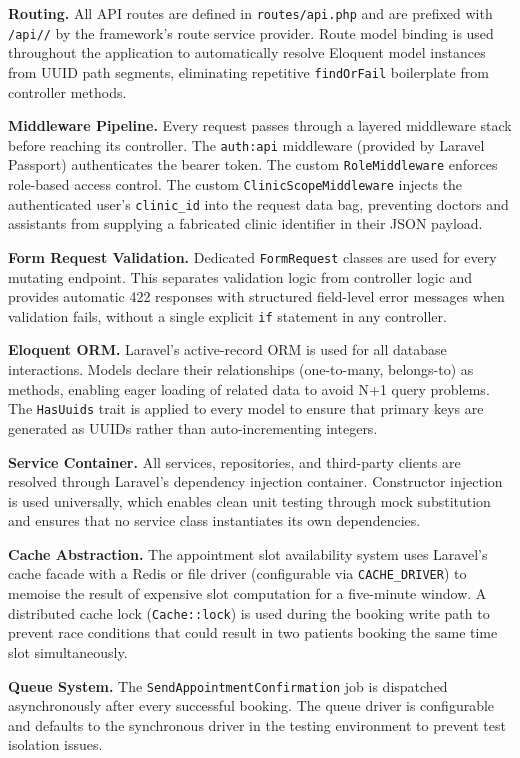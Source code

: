\textbf{Routing.} All API routes are defined in
\texttt{routes/api.php} and are prefixed with \texttt{/api/\apiversion{}/}
by the framework's route service provider. Route model binding is used
throughout the application to automatically resolve Eloquent model
instances from UUID path segments, eliminating repetitive
\texttt{findOrFail} boilerplate from controller methods.

\textbf{Middleware Pipeline.} Every request passes through a layered
middleware stack before reaching its controller. The \texttt{auth:api}
middleware (provided by Laravel Passport) authenticates the bearer token.
The custom \texttt{RoleMiddleware} enforces role-based access control.
The custom \texttt{ClinicScopeMiddleware} injects the authenticated
user's \texttt{clinic\_id} into the request data bag, preventing doctors
and assistants from supplying a fabricated clinic identifier in their
JSON payload.

\textbf{Form Request Validation.} Dedicated \texttt{FormRequest} classes
are used for every mutating endpoint. This separates validation logic
from controller logic and provides automatic 422 responses with
structured field-level error messages when validation fails, without a
single explicit \texttt{if} statement in any controller.

\textbf{Eloquent ORM.} Laravel's active-record ORM is used for all
database interactions. Models declare their relationships (one-to-many,
belongs-to) as methods, enabling eager loading of related data to
avoid N+1 query problems. The \texttt{HasUuids} trait is applied to
every model to ensure that primary keys are generated as UUIDs rather
than auto-incrementing integers.

\textbf{Service Container.} All services, repositories, and third-party
clients are resolved through Laravel's dependency injection container.
Constructor injection is used universally, which enables clean unit
testing through mock substitution and ensures that no service class
instantiates its own dependencies.

\textbf{Cache Abstraction.} The appointment slot availability system
uses Laravel's cache facade with a Redis or file driver (configurable via
\texttt{CACHE\_DRIVER}) to memoise the result of expensive slot computation
for a five-minute window. A distributed cache lock (\texttt{Cache::lock})
is used during the booking write path to prevent race conditions that
could result in two patients booking the same time slot simultaneously.

\textbf{Queue System.} The \texttt{SendAppointmentConfirmation} job is
dispatched asynchronously after every successful booking. The queue
driver is configurable and defaults to the synchronous driver in the
testing environment to prevent test isolation issues.

